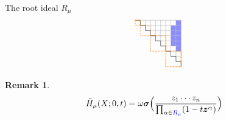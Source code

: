 \documentclass[dvipsnames,handout]{beamer}
\newcommand{\zz}{{\boldsymbol z}}
\newcommand{\sigmabold}{\boldsymbol \sigma}
\newcommand{\Htild}{\tilde{H}}
\theoremstyle{definition}
\newtheorem{rmk}[thm]{Remark}
\newcommand{\qtrootcolor}{blue!45}
\newcommand{\colorb}[1]{\textcolor{blue}{#1}}
\newcounter{c}
\begin{document}
\begin{frame}{The root ideal \(R_\mu\)}
\begin{align*}
\begin{tikzpicture}[scale=.213]
 \draw[draw = none, fill = \qtrootcolor] (8,-2) rectangle (9,-3);
 \draw[draw = none, fill = \qtrootcolor] (8,-3) rectangle (9,-4);
 \draw[draw = none, fill = \qtrootcolor] (8,-4) rectangle (9,-5);
 \draw[draw = none, fill = \qtrootcolor] (8,-5) rectangle (9,-6);
 \draw[draw = none, fill = \qtrootcolor] (9,-1) rectangle (10,-2);
 \draw[draw = none, fill = \qtrootcolor] (9,-2) rectangle (10,-3);
 \draw[draw = none, fill = \qtrootcolor] (9,-3) rectangle (10,-4);
 \draw[draw = none, fill = \qtrootcolor] (9,-4) rectangle (10,-5);
 \draw[draw = none, fill = \qtrootcolor] (9,-5) rectangle (10,-6);
 \draw[draw = none, fill = \qtrootcolor] (9,-6) rectangle (10,-7);
 \draw[thin, black!31] (1,-1) -- (10,-1);
\draw[thin, black!31] (2,-1) -- (2,-1);
\draw[thin, black!31] (2,-2) -- (10,-2);
\draw[thin, black!31] (3,-2) -- (3,-1);
\draw[thin, black!31] (3,-3) -- (10,-3);
\draw[thin, black!31] (4,-3) -- (4,-1);
\draw[thin, black!31] (4,-4) -- (10,-4);
\draw[thin, black!31] (5,-4) -- (5,-1);
\draw[thin, black!31] (5,-5) -- (10,-5);
\draw[thin, black!31] (6,-5) -- (6,-1);
\draw[thin, black!31] (6,-6) -- (10,-6);
\draw[thin, black!31] (7,-6) -- (7,-1);
\draw[thin, black!31] (7,-7) -- (10,-7);
\draw[thin, black!31] (8,-7) -- (8,-1);
\draw[thin, black!31] (8,-8) -- (10,-8);
\draw[thin, black!31] (9,-8) -- (9,-1);
\draw[thin, black!31] (9,-9) -- (10,-9);
\draw[thin, black!31] (10,-9) -- (10,-1);
 \draw[thin] (1,-1) -- (2,-1);
\draw[thin] (2,-1) -- (2,-2);
\draw[thin] (2,-2) -- (3,-2);
\draw[thin] (3,-2) -- (3,-3);
\draw[thin] (3,-3) -- (4,-3);
\draw[thin] (4,-3) -- (4,-4);
\draw[thin] (4,-4) -- (5,-4);
\draw[thin] (5,-4) -- (5,-5);
\draw[thin] (5,-5) -- (6,-5);
\draw[thin] (6,-5) -- (6,-6);
\draw[thin] (6,-6) -- (7,-6);
\draw[thin] (7,-6) -- (7,-7);
\draw[thin] (7,-7) -- (8,-7);
\draw[thin] (8,-7) -- (8,-8);
\draw[thin] (8,-8) -- (9,-8);
\draw[thin] (9,-8) -- (9,-9);
\draw[thin] (9,-9) -- (10,-9);
\draw[thin] (10,-9) -- (10,-10);
\draw[thick, densely dotted, orange] (1,-1) rectangle (2,-2);
\draw[thick, densely dotted, orange] (2,-2) rectangle (4,-4);
\draw[thick, densely dotted, orange] (4,-4) rectangle (7,-7);
\draw[thick, densely dotted, orange] (7,-7) rectangle (10,-10);
\end{tikzpicture}
\end{align*}
\vspace{-0.5cm}
\pause
\begin{rmk}
  \begin{align*}
    \Htild_\mu(X;0,t) 
    & =
      \omega \sigmabold
      \Big( \frac{z_1\cdots z_n}{\prod_{\alpha \in
      \colorb{R_\mu}}(1 - t \zz^\alpha)} 
      \Big)
  \end{align*}
\end{rmk}
\end{frame}
\end{document}
